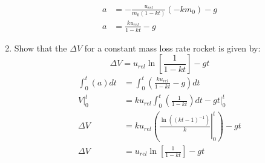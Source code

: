 \documentclass{article}
\begin{document}
\begin{enumerate}[label = \textbf{\arabic*.}]
\begin{align*}
			a & = -\frac{u_{rel}}{m_0(1 - kt)}(-km_0) - g \\
			a & = \frac{ku_{rel}}{1 - kt} - g
		\end{align*}
	\item Show that the $ \Delta V $ for a constant mass loss rate rocket is given by:
		\begin{equation*}
			\Delta V = u_{rel}\ln \left[ \frac{1}{1 - kt} \right] - gt
		\end{equation*}
		\begin{align*}
			\int_{0}^{t} (a) dt & = \int_0^{t} \left( \frac{ku_{rel}}{1 - kt} - g \right) dt \\
			\left. V \right|_0^t & = ku_{rel} \int_0^t \left( \frac{1}{1 - kt} \right) dt - \left. gt \right|_0^t \\
			\Delta V & = ku_{rel} \left( \left. \frac{\ln((kt - 1)^{-1})}{k} \right|_0^t \right) - gt \\
			\Delta V & = u_{rel}\ln \left[ \frac{1}{1 - kt} \right] - gt
		\end{align*}
\end{enumerate}
\end{document}
